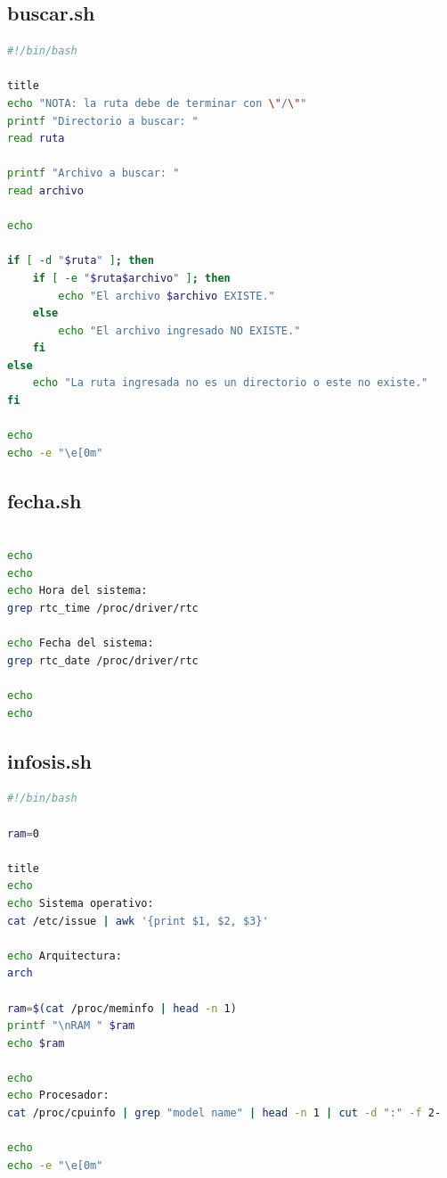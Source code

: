 \documentclass[letter,11pt]{article}
\begin{document}
\subsection{buscar.sh}
\begin{lstlisting}[language=sh, caption={Comando buscar}, label={lst:shellscript}, basicstyle=\small]
#!/bin/bash

title
echo "NOTA: la ruta debe de terminar con \"/\""
printf "Directorio a buscar: "
read ruta

printf "Archivo a buscar: "
read archivo

echo

if [ -d "$ruta" ]; then
    if [ -e "$ruta$archivo" ]; then
        echo "El archivo $archivo EXISTE."
    else
        echo "El archivo ingresado NO EXISTE."
    fi
else
    echo "La ruta ingresada no es un directorio o este no existe."
fi

echo
echo -e "\e[0m"

\end{lstlisting}

\subsection{fecha.sh}
\begin{lstlisting}[language=sh, caption={Fecha y hora}, label={lst:shellscript}, basicstyle=\small]

echo
echo
echo Hora del sistema:
grep rtc_time /proc/driver/rtc

echo Fecha del sistema:
grep rtc_date /proc/driver/rtc

echo
echo
\end{lstlisting}



\subsection{infosis.sh}
\begin{lstlisting}[language=sh, caption={Información del sistema}, label={lst:shellscript}, basicstyle=\small]
#!/bin/bash

ram=0

title
echo
echo Sistema operativo:
cat /etc/issue | awk '{print $1, $2, $3}'

echo Arquitectura:
arch

ram=$(cat /proc/meminfo | head -n 1)
printf "\nRAM " $ram
echo $ram

echo
echo Procesador:
cat /proc/cpuinfo | grep "model name" | head -n 1 | cut -d ":" -f 2-

echo
echo -e "\e[0m"

\end{lstlisting}
\end{document}
